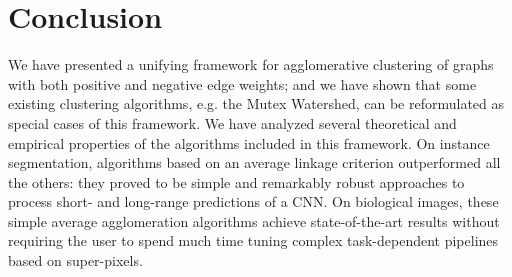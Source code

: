 \section{Conclusion}
We have presented a unifying framework for agglomerative clustering of graphs with both positive and negative edge weights; and we have shown that some existing clustering algorithms, e.g. the Mutex Watershed, can be reformulated as special cases of this framework. 
We have analyzed several theoretical and empirical properties of the algorithms included in this framework. On instance segmentation, algorithms based on an average linkage criterion outperformed all the others: they proved to be simple and remarkably robust approaches to process short- and long-range predictions of a CNN.
On biological images, these simple average agglomeration algorithms achieve state-of-the-art results without requiring the user to spend much time tuning complex task-dependent pipelines based on super-pixels.

